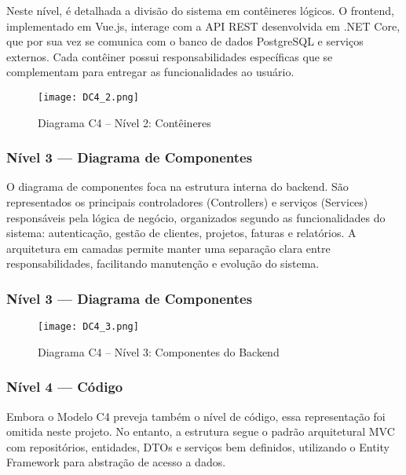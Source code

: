 \documentclass[a4paper,12pt]{article}
\begin{document}
Neste nível, é detalhada a divisão do sistema em contêineres lógicos. O frontend, implementado em Vue.js, interage com a API REST desenvolvida em .NET Core, que por sua vez se comunica com o banco de dados PostgreSQL e serviços externos. Cada contêiner possui responsabilidades específicas que se complementam para entregar as funcionalidades ao usuário.

\begin{figure}[H]
  \centering
  \texttt{[image: DC4\_2.png]}
  \caption{Diagrama C4 – Nível 2: Contêineres}
  \label{fig:c4-container}
\end{figure}

\subsubsection*{Nível 3 — Diagrama de Componentes}

O diagrama de componentes foca na estrutura interna do backend. São representados os principais controladores (Controllers) e serviços (Services) responsáveis pela lógica de negócio, organizados segundo as funcionalidades do sistema: autenticação, gestão de clientes, projetos, faturas e relatórios. A arquitetura em camadas permite manter uma separação clara entre responsabilidades, facilitando manutenção e evolução do sistema.

\afterpage{\clearpage}
\begin{landscape}
\subsubsection*{Nível 3 — Diagrama de Componentes}
\begin{figure}[H]
  \centering
  \texttt{[image: DC4\_3.png]}
  \caption{Diagrama C4 – Nível 3: Componentes do Backend}
  \label{fig:c4-componentes}
\end{figure}
\end{landscape}

\subsubsection*{Nível 4 — Código}

Embora o Modelo C4 preveja também o nível de código, essa representação foi omitida neste projeto. No entanto, a estrutura segue o padrão arquitetural MVC com repositórios, entidades, DTOs e serviços bem definidos, utilizando o Entity Framework para abstração de acesso a dados.
\end{document}
